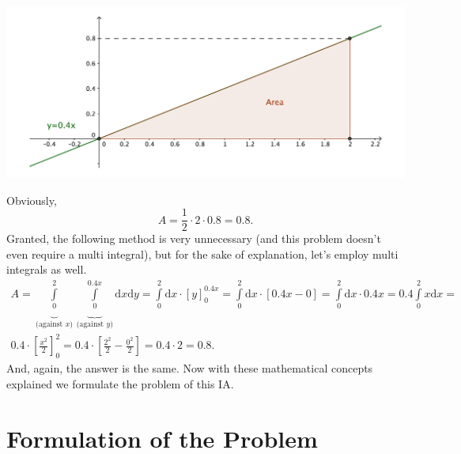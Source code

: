 \documentclass[11pt,a4paper]{article}
\numberwithin{equation}{subsection}
\begin{document}
\begin{center}
\includegraphics[scale=0.4]{pic-multiexample}
\end{center}
Obviously, $$A=\frac{1}{2}\cdot 2 \cdot 0.8 = 0.8.$$ Granted, the following method is very unnecessary (and this problem doesn't even require a multi integral), but for the sake of explanation, let's employ multi integrals as well.
\begin{gather*}
A = \underbrace{\int\limits_{0}^{2}}_{\text{(against } x\text{)}} \underbrace{\int\limits_{0}^{0.4x}}_{\text{(against } y\text{)}} \mathrm{d}x \mathrm{d}y =  \int\limits_{0}^{2} \mathrm{d}x \cdot \left[ y \right]_{0}^{0.4x} =  \int\limits_{0}^{2} \mathrm{d}x \cdot  \left[ 0.4x - 0 \right] = \int\limits_{0}^{2} \mathrm{d}x \cdot 0.4x = 0.4 \int\limits_{0}^{2} x\mathrm{d}x = \\
0.4 \cdot \left[ \frac{x^{2}}{2} \right]_{0}^{2} = 0.4 \cdot \left[ \frac{2^{2}}{2} - \frac{0^{2}}{2} \right] = 0.4 \cdot 2 = 0.8.
\end{gather*}
And, again, the answer is the same. Now with these mathematical concepts explained we formulate the problem of this IA.

\section{Formulation of the Problem}
\end{document}
